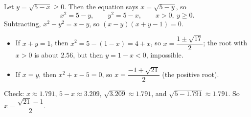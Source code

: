 Let $y=\sqrt{5-x}\ge0$. Then the equation says $x=\sqrt{5-y}$, so
\[x^2=5-y,\qquad y^2=5-x,\qquad x>0,\ y\ge0.\]
Subtracting, $x^2-y^2=x-y$, so $(x-y)(x+y-1)=0$.
\begin{itemize}
\item If $x+y=1$, then $x^2=5-(1-x)=4+x$, so $x=\dfrac{1\pm\sqrt{17}}2$; the root with $x>0$ is about $2.56$, but then $y=1-x<0$, impossible.
\item If $x=y$, then $x^2+x-5=0$, so $x=\dfrac{-1+\sqrt{21}}{2}$ (the positive root).
\end{itemize}
Check: $x\approx1.791$, $5-x\approx3.209$, $\sqrt{3.209}\approx1.791$, and $\sqrt{5-1.791}\approx1.791$. So $\boxed{x=\dfrac{\sqrt{21}-1}{2}}$.
